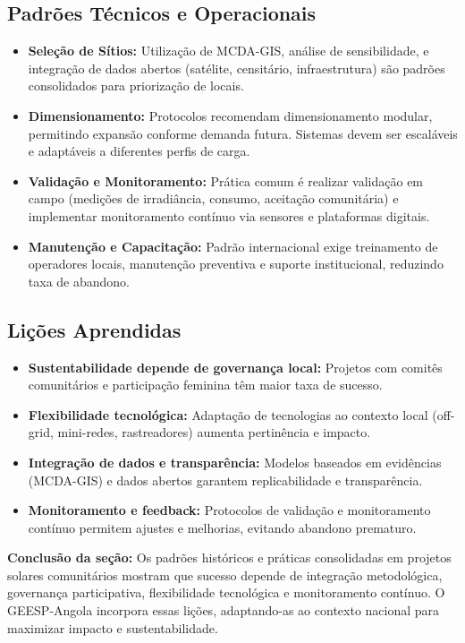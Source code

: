 \documentclass[12pt, a4paper]{article}
\begin{document}
\subsection{Padrões Técnicos e Operacionais}
\begin{itemize}
  \item \textbf{Seleção de Sítios:} Utilização de MCDA-GIS, análise de sensibilidade, e integração de dados abertos (satélite, censitário, infraestrutura) são padrões consolidados para priorização de locais.
  \item \textbf{Dimensionamento:} Protocolos recomendam dimensionamento modular, permitindo expansão conforme demanda futura. Sistemas devem ser escaláveis e adaptáveis a diferentes perfis de carga.
  \item \textbf{Validação e Monitoramento:} Prática comum é realizar validação em campo (medições de irradiância, consumo, aceitação comunitária) e implementar monitoramento contínuo via sensores e plataformas digitais.
  \item \textbf{Manutenção e Capacitação:} Padrão internacional exige treinamento de operadores locais, manutenção preventiva e suporte institucional, reduzindo taxa de abandono.
\end{itemize}

\subsection{Lições Aprendidas}
\begin{itemize}
  \item \textbf{Sustentabilidade depende de governança local:} Projetos com comitês comunitários e participação feminina têm maior taxa de sucesso.
  \item \textbf{Flexibilidade tecnológica:} Adaptação de tecnologias ao contexto local (off-grid, mini-redes, rastreadores) aumenta pertinência e impacto.
  \item \textbf{Integração de dados e transparência:} Modelos baseados em evidências (MCDA-GIS) e dados abertos garantem replicabilidade e transparência.
  \item \textbf{Monitoramento e feedback:} Protocolos de validação e monitoramento contínuo permitem ajustes e melhorias, evitando abandono prematuro.
\end{itemize}

\textbf{Conclusão da seção:} Os padrões históricos e práticas consolidadas em projetos solares comunitários mostram que sucesso depende de integração metodológica, governança participativa, flexibilidade tecnológica e monitoramento contínuo. O GEESP-Angola incorpora essas lições, adaptando-as ao contexto nacional para maximizar impacto e sustentabilidade.
\end{document}
